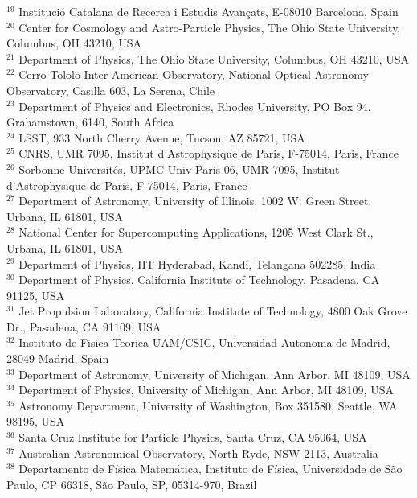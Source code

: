 $^{19}$ Instituci\'o Catalana de Recerca i Estudis Avan\c{c}ats, E-08010 Barcelona, Spain\\
$^{20}$ Center for Cosmology and Astro-Particle Physics, The Ohio State University, Columbus, OH 43210, USA\\
$^{21}$ Department of Physics, The Ohio State University, Columbus, OH 43210, USA\\
$^{22}$ Cerro Tololo Inter-American Observatory, National Optical Astronomy Observatory, Casilla 603, La Serena, Chile\\
$^{23}$ Department of Physics and Electronics, Rhodes University, PO Box 94, Grahamstown, 6140, South Africa\\
$^{24}$ LSST, 933 North Cherry Avenue, Tucson, AZ 85721, USA\\
$^{25}$ CNRS, UMR 7095, Institut d'Astrophysique de Paris, F-75014, Paris, France\\
$^{26}$ Sorbonne Universit\'es, UPMC Univ Paris 06, UMR 7095, Institut d'Astrophysique de Paris, F-75014, Paris, France\\
$^{27}$ Department of Astronomy, University of Illinois, 1002 W. Green Street, Urbana, IL 61801, USA\\
$^{28}$ National Center for Supercomputing Applications, 1205 West Clark St., Urbana, IL 61801, USA\\
$^{29}$ Department of Physics, IIT Hyderabad, Kandi, Telangana 502285, India\\
$^{30}$ Department of Physics, California Institute of Technology, Pasadena, CA 91125, USA\\
$^{31}$ Jet Propulsion Laboratory, California Institute of Technology, 4800 Oak Grove Dr., Pasadena, CA 91109, USA\\
$^{32}$ Instituto de Fisica Teorica UAM/CSIC, Universidad Autonoma de Madrid, 28049 Madrid, Spain\\
$^{33}$ Department of Astronomy, University of Michigan, Ann Arbor, MI 48109, USA\\
$^{34}$ Department of Physics, University of Michigan, Ann Arbor, MI 48109, USA\\
$^{35}$ Astronomy Department, University of Washington, Box 351580, Seattle, WA 98195, USA\\
$^{36}$ Santa Cruz Institute for Particle Physics, Santa Cruz, CA 95064, USA\\
$^{37}$ Australian Astronomical Observatory, North Ryde, NSW 2113, Australia\\
$^{38}$ Departamento de F\'isica Matem\'atica, Instituto de F\'isica, Universidade de S\~ao Paulo, CP 66318, S\~ao Paulo, SP, 05314-970, Brazil\\
